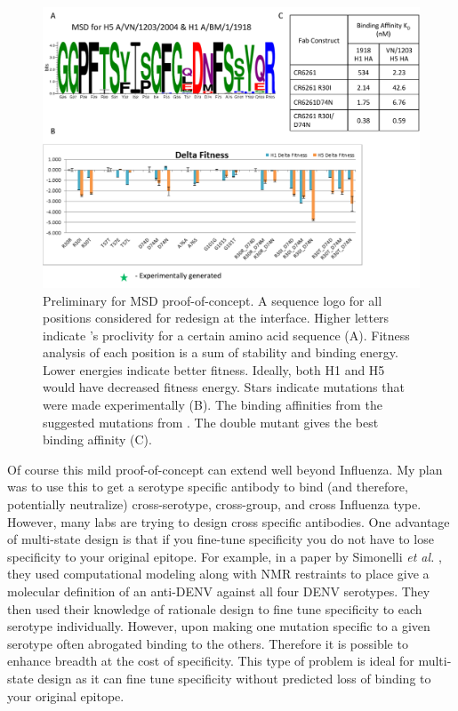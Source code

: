\begin{figure}[!t]
   \centering
   \includegraphics[width=.9\textwidth]{images/chapter5/figure5_2.pdf}
   \caption[Preliminary for MSD Proof-of-Concept]{Preliminary for MSD proof-of-concept. A sequence logo for all positions considered for redesign at the interface. Higher letters indicate \rosetta's proclivity for a certain amino acid sequence (A). Fitness analysis of each position is a sum of stability and binding energy. Lower energies indicate better fitness. Ideally, both H1 and H5 would have decreased fitness energy. Stars indicate mutations that were made experimentally (B). The binding affinities from the suggested mutations from \rosetta. The double mutant gives the best binding affinity (C).}
       \label{fig:fig5_2}
\end{figure}

Of course this mild proof-of-concept can extend well beyond Influenza. My plan was to use this to get a serotype specific antibody to bind (and therefore, potentially neutralize) cross-serotype, cross-group, and cross Influenza type. However, many labs are trying to design cross specific antibodies. One advantage of multi-state design is that if you fine-tune specificity you do not have to lose specificity to your original epitope. For example, in a paper by Simonelli \textit{et al.} \citep{Simonelli:2013jc}, they used computational modeling along with NMR restraints to place give a molecular definition of an anti-DENV against all four DENV serotypes. They then used their knowledge of rationale design to fine tune specificity to each serotype individually. However, upon making one mutation specific to a given serotype often abrogated binding to the others. Therefore it is possible to enhance breadth at the cost of specificity. This type of problem is ideal for multi-state design as it can fine tune specificity without predicted loss of binding to your original epitope.

